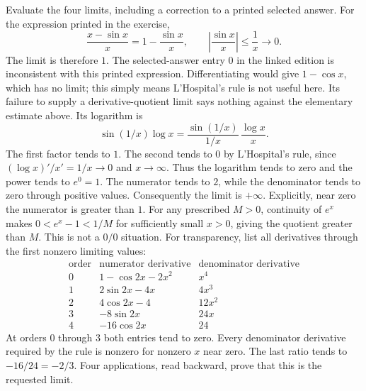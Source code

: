 \goal Evaluate the four limits, including a correction to a printed selected answer.
For the expression printed in the exercise,
\[
 \frac{x-\sin x}x=1-\frac{\sin x}x,
 \qquad\left|\frac{\sin x}x\right|\le\frac1x\longrightarrow0.
\]
The limit is therefore $1$. The selected-answer entry $0$ in the linked edition is inconsistent with this printed expression. Differentiating would give $1-\cos x$, which has no limit; this simply means L'Hospital's rule is not useful here. Its failure to supply a derivative-quotient limit says nothing against the elementary estimate above.
Its logarithm is
\[
 \sin(1/x)\log x
 =\frac{\sin(1/x)}{1/x}\,\frac{\log x}{x}.
\]
The first factor tends to $1$. The second tends to $0$ by L'Hospital's rule, since $(\log x)'/x'=1/x\to0$ and $x\to\infty$. Thus the logarithm tends to zero and the power tends to $e^0=1$.
The numerator tends to $2$, while the denominator tends to zero through positive values. Consequently the limit is $+\infty$. Explicitly, near zero the numerator is greater than $1$. For any prescribed $M>0$, continuity of $e^x$ makes $0<e^x-1<1/M$ for sufficiently small $x>0$, giving the quotient greater than $M$. This is not a $0/0$ situation.
For transparency, list all derivatives through the first nonzero limiting values:
\[
\begin{array}{c|c|c}
 \text{order}&\text{numerator derivative}&\text{denominator derivative}\\ \hline
 0&1-\cos2x-2x^2&x^4\\
 1&2\sin2x-4x&4x^3\\
 2&4\cos2x-4&12x^2\\
 3&-8\sin2x&24x\\
 4&-16\cos2x&24
\end{array}
\]
At orders $0$ through $3$ both entries tend to zero. Every denominator derivative required by the rule is nonzero for nonzero $x$ near zero. The last ratio tends to $-16/24=-2/3$. Four applications, read backward, prove that this is the requested limit.

